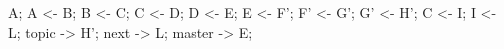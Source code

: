   \rootCommit A;
  \commit A <- B;
  \commit B <- C;
  \commit C <- D;
  \commit D <- E;
  \downCommit E <- F';
  \commit F' <- G';
  \commit G' <- H';
  \downCommit C <- I;
  \commit I <- L;
  \branchref topic -> H';
  \branchref next -> L;
  \branchref master -> E;
\finefiguranofloattikz
